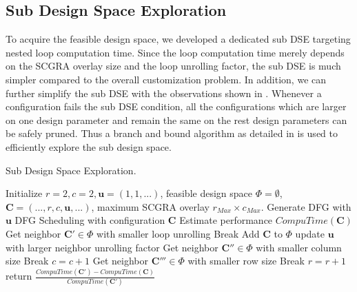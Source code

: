 \subsection{Sub Design Space Exploration}
To acquire the feasible design space, we developed a dedicated sub DSE 
targeting nested loop computation time. Since the loop computation 
time merely depends on the SCGRA overlay 
size and the loop unrolling factor, the sub DSE is much simpler 
compared to the overall customization problem. In addition, we can 
further simplify the sub DSE with the observations shown in .  
Whenever a configuration fails the sub DSE condition, all the 
configurations which are larger on one design parameter and remain the same 
on the rest design parameters can be safely pruned. Thus a branch and 
bound algorithm as detailed in  is used 
to efficiently explore the sub design space.
\begin{algorithm}[h]
\caption{Sub Design Space Exploration.}
\label{alg:revenuealg}
\begin{algorithmic}
\PROCEDURE{}
\STATE Initialize $r=2, c=2, \bm{u}=(1,1,...)$, feasible design space $\Phi=\emptyset$,
$\bm{C}=(...,r,c,\bm{u},...)$, maximum SCGRA overlay $r_{Max}\times c_{Max}$.
\STATE Generate DFG with $\bm{u}$
\STATE DFG Scheduling with configuration $\bm{C}$
\STATE Estimate performance $CompuTime(\bm{C})$
\STATE Get neighbor $\bm{C'} \in \Phi$ with smaller loop unrolling
\STATE Break
\ELSE 
\STATE Add $\bm{C}$ to $\Phi$
\ENDIF
\STATE update $\bm{u}$ with larger neighbor unrolling factor
\ENDWHILE
\STATE Get neighbor $\bm{C''} \in \Phi$ with smaller column size
\STATE Break
\ENDIF
\STATE $c=c+1$
\ENDWHILE
\STATE Get neighbor $\bm{C'''} \in \Phi$ with smaller row size
\STATE Break
\ENDIF
\STATE $r=r+1$
\ENDWHILE
\ENDPROCEDURE
\STATE
{}
\STATE return $\frac{CompuTime(\bm{C'})-CompuTime(\bm{C})}{CompuTime(\bm{C'})}$ 
\ENDPROCEDURE
\end{algorithmic}
\end{algorithm}


